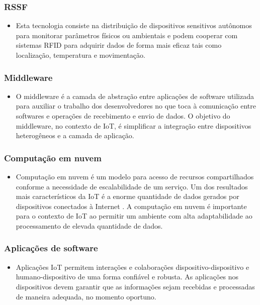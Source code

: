 	\subsubsection{\acrfull{RSSF}}
		\begin{itemize}
			\item Esta tecnologia consiste na distribuição de dispositivos sensitivos autônomos para monitorar parâmetros físicos ou
			ambientais e podem cooperar com sistemas \acrshort{RFID} para adquirir dados de forma mais eficaz tais como localização, temperatura e movimentação.
			\cite{IOTS}
		\end{itemize}
	\subsubsection{Middleware}
		\begin{itemize}
			\item O middleware é a camada de abstração entre aplicações de software utilizada para auxiliar o trabalho dos desenvolvedores
			 no que toca à comunicação entre softwares e operações de recebimento e envio de dados. O objetivo do middleware, no contexto
			  de \acrshort{IoT}, é simplificar a integração entre dispositivos heterogêneos e a camada de aplicação.
		\end{itemize}
	\subsubsection{Computação em nuvem}
		\begin{itemize}
			\item Computação em nuvem é um modelo para acesso de recursos compartilhados conforme a necessidade de escalabilidade de um serviço. Um dos resultados mais característicos
			da \acrshort{IoT} é a enorme quantidade de dados gerados por dispositivos conectados à Internet \cite{IOTV}. A computação em nuvem é importante para o contexto de \acrlong{IoT}
			ao permitir um ambiente com alta adaptabilidade ao processamento de elevada quantidade de dados.
		\end{itemize}
	\subsubsection{Aplicações de software}
		\begin{itemize}
			\item Aplicações \acrshort{IoT} permitem interações e colaborações dispositivo-dispositivo e humano-dispositivo de uma forma confiável e robusta.
			As aplicações nos dispositivos devem garantir que as informações sejam recebidas e processadas de maneira adequada, no momento
			oportuno.
		\end{itemize}

